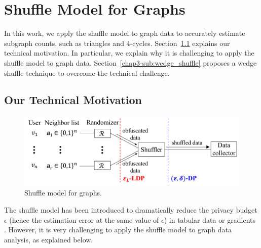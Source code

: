 \section{Shuffle Model for Graphs}
\label{chap3-sec:shuffle}
In this work, we apply the shuffle model to graph data to accurately estimate subgraph counts, such as triangles and 4-cycles. 
Section~\ref{chap3-sub:technical} explains our technical motivation. 
In particular, we explain why it is challenging to apply the shuffle model to graph data. 
Section~\ref{chap3-sub:wedge_shuffle} proposes a wedge shuffle technique to overcome the technical challenge. 

\subsection{Our Technical Motivation}
\label{chap3-sub:technical}

\begin{figure}[t]
  \centering
  \includegraphics[width=0.99\linewidth]{fig/shuffle.pdf}
  
  \caption{Shuffle model for graphs. 
  }
  \label{chap3-fig:shuffle_model}
\end{figure}

The shuffle model has been introduced to dramatically reduce the privacy budget $\epsilon$ (hence the estimation error at the same value of $\epsilon$) in tabular data \cite{Wang_PVLDB20} or 
gradients 
\cite{Girgis_AISTATS21,Liu_AAAI21}. 
However, it is very challenging to apply the shuffle model to graph data analysis, as explained below. 

